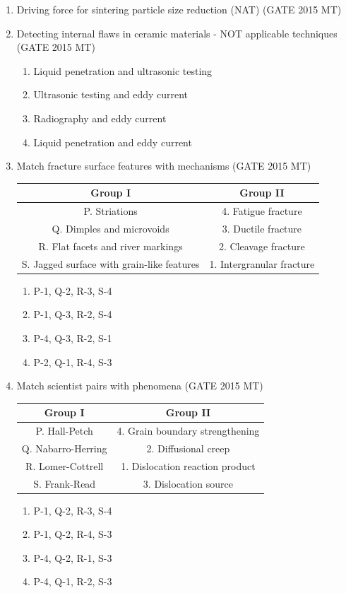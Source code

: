 \documentclass[12pt]{article}
\begin{document}
\begin{enumerate}
\item Driving force for sintering particle size reduction (NAT) (GATE 2015 MT)

\item Detecting internal flaws in ceramic materials - NOT applicable techniques (GATE 2015 MT)
\begin{enumerate}[label=(\alph*)]
  \item Liquid penetration and ultrasonic testing
  \item Ultrasonic testing and eddy current
  \item Radiography and eddy current
  \item Liquid penetration and eddy current
\end{enumerate}

\item Match fracture surface features with mechanisms (GATE 2015 MT)
\begin{table}[h]
\centering
\begin{tabular}{|c|c|}
\hline
Group I & Group II \\
\hline
P. Striations & 4. Fatigue fracture \\
Q. Dimples and microvoids & 3. Ductile fracture \\
R. Flat facets and river markings & 2. Cleavage fracture \\
S. Jagged surface with grain-like features & 1. Intergranular fracture \\
\hline
\end{tabular}
\end{table}
\begin{enumerate}[label=(\alph*)]
  \item P-1, Q-2, R-3, S-4
  \item P-1, Q-3, R-2, S-4
  \item P-4, Q-3, R-2, S-1
  \item P-2, Q-1, R-4, S-3
\end{enumerate}

\item Match scientist pairs with phenomena (GATE 2015 MT)
\begin{table}[h]
\centering
\begin{tabular}{|c|c|}
\hline
Group I & Group II \\
\hline
P. Hall-Petch & 4. Grain boundary strengthening \\
Q. Nabarro-Herring & 2. Diffusional creep \\
R. Lomer-Cottrell & 1. Dislocation reaction product \\
S. Frank-Read & 3. Dislocation source \\
\hline
\end{tabular}
\end{table}
\begin{enumerate}[label=(\alph*)]
  \item P-1, Q-2, R-3, S-4
  \item P-1, Q-2, R-4, S-3
  \item P-4, Q-2, R-1, S-3
  \item P-4, Q-1, R-2, S-3
\end{enumerate}


\end{enumerate}
\end{document}

